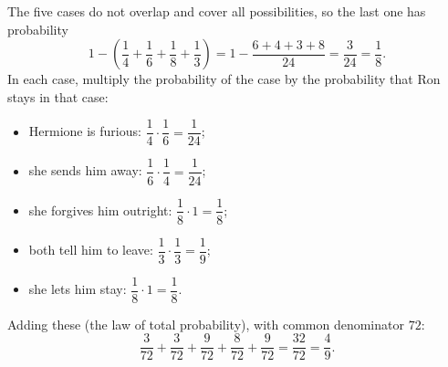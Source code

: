 The five cases do not overlap and cover all possibilities, so the last one has probability
\[1-\left(\dfrac14+\dfrac16+\dfrac18+\dfrac13\right)=1-\dfrac{6+4+3+8}{24}=\dfrac{3}{24}=\dfrac18.\]
In each case, multiply the probability of the case by the probability that Ron stays in that case:
\begin{itemize}
\item Hermione is furious: $\dfrac14\cdot\dfrac16=\dfrac1{24}$;
\item she sends him away: $\dfrac16\cdot\dfrac14=\dfrac1{24}$;
\item she forgives him outright: $\dfrac18\cdot1=\dfrac18$;
\item both tell him to leave: $\dfrac13\cdot\dfrac13=\dfrac19$;
\item she lets him stay: $\dfrac18\cdot1=\dfrac18$.
\end{itemize}
Adding these (the law of total probability), with common denominator $72$:
\[\dfrac{3}{72}+\dfrac{3}{72}+\dfrac{9}{72}+\dfrac{8}{72}+\dfrac{9}{72}=\dfrac{32}{72}=\boxed{\dfrac49}.\]
